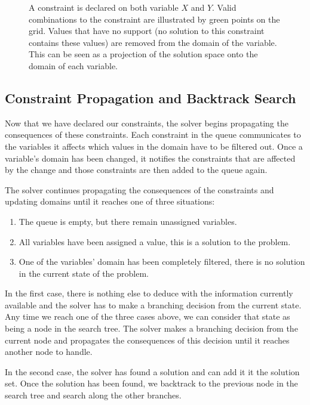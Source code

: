 \documentclass[../Document.tex]{subfiles}
\begin{document}
\begin{figure}[ht]
    \centering
    
    \caption[Domain filtering on one variable.]{A constraint is declared on both variable $X$ and $Y$. Valid combinations to the constraint are illustrated by green points on the grid. Values that have no support (no solution to this constraint contains these values) are removed from the domain of the variable. This can be seen as a projection of the solution space onto the domain of each variable.}
    \label{fig:domain_filtering}
\end{figure} 

\subsection{Constraint Propagation and Backtrack Search}
Now that we have declared our constraints, the solver begins propagating the consequences of these constraints. Each constraint in the queue communicates to the variables it affects which values in the domain have to be filtered out. Once a variable's domain has been changed, it notifies the constraints that are affected by the change and those constraints are then added to the queue again.

The solver continues propagating the consequences of the constraints and updating domains until it reaches one of three situations: 
\begin{enumerate}
    \item The queue is empty, but there remain unassigned variables.
    \item All variables have been assigned a value, this is a solution to the problem.
    \item One of the variables' domain has been completely filtered, there is no solution in the current state of the problem.
\end{enumerate}

In the first case, there is nothing else to deduce with the information currently available and the solver has to make a branching decision from the current state. Any time we reach one of the three cases above, we can consider that state as being a node in the search tree. The solver makes a branching decision from the current node and propagates the consequences of this decision until it reaches another node to handle.

In the second case, the solver has found a solution and can add it it the solution set. Once the solution has been found, we backtrack to the previous node in the search tree and search along the other branches.
\end{document}
